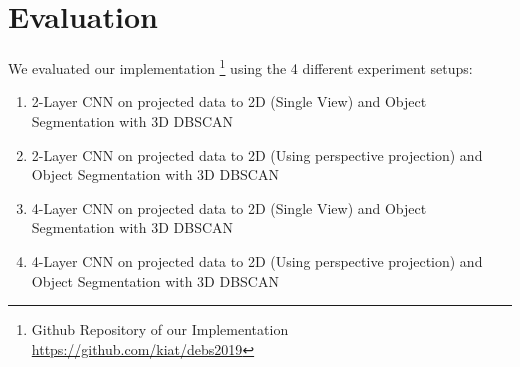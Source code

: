 \section{Evaluation}\label{sec:Evaluation}

We evaluated our implementation \footnote{Github Repository
of our Implementation \url{https://github.com/kiat/debs2019}} using the 4 different experiment
setups:
\begin{enumerate}
  \item 2-Layer CNN on projected data to 2D (Single View) and Object Segmentation with 3D DBSCAN
  \item 2-Layer CNN on projected data to 2D (Using perspective projection) and Object Segmentation with 3D DBSCAN
  \item 4-Layer CNN on projected data to 2D (Single View) and Object Segmentation with 3D DBSCAN
  \item 4-Layer CNN on projected data to 2D (Using perspective projection) and Object Segmentation with 3D DBSCAN
\end{enumerate}

